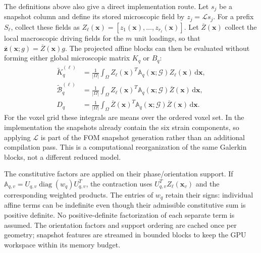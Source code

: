 \documentclass[pdflatex,sn-basic,Numbered]{sn-jnl}
\newcommand{\G}{\mathcal{G}}
\begin{document}
The definitions above also give a direct implementation route. Let
\(s_j\) be a snapshot column and define its stored microscopic field by
\(z_j=\mathcal Ls_j\). For a prefix \(S_\ell\), collect these fields as
\(Z_\ell(\boldsymbol x)=[z_1(\boldsymbol x),\ldots,z_{r_\ell}(\boldsymbol x)]\).
Let \(\overline Z(\boldsymbol x)\) collect the local macroscopic driving
fields for the \(m\) unit loadings, so that
\(\overline{\boldsymbol z}(\boldsymbol x;g)=\overline Z(\boldsymbol x)g\).
The projected affine blocks can then be evaluated without forming either
global microscopic matrix \(K_q\) or \(B_q\):
\begin{align}
\widetilde K_q^{(\ell)}
&=\frac{1}{|\Omega|}\int_\Omega
Z_\ell(\boldsymbol x)^T\mathbb A_q(\boldsymbol x;\G)
Z_\ell(\boldsymbol x)\,\mathrm d\boldsymbol x,\\
\widetilde{\mathcal B}_q^{(\ell)}
&=\frac{1}{|\Omega|}\int_\Omega
Z_\ell(\boldsymbol x)^T\mathbb A_q(\boldsymbol x;\G)
\overline Z(\boldsymbol x)\,\mathrm d\boldsymbol x,\\
D_q
&=\frac{1}{|\Omega|}\int_\Omega
\overline Z(\boldsymbol x)^T\mathbb A_q(\boldsymbol x;\G)
\overline Z(\boldsymbol x)\,\mathrm d\boldsymbol x.
\end{align}
For the voxel grid these integrals are means over the ordered voxel set. In
the implementation the snapshots already contain the six strain components,
so applying \(\mathcal L\) is part of the FOM snapshot generation rather than
an additional compilation pass. This is a computational reorganization of the
same Galerkin blocks, not a different reduced model.

The constitutive factors are applied on their phase/orientation support. If
\(\mathbb A_{q,v}=U_{q,v}\operatorname{diag}(w_q)U_{q,v}^T\), the contraction
uses \(U_{q,v}^TZ_\ell(\boldsymbol x_v)\) and the corresponding weighted
products. The entries of \(w_q\) retain their signs: individual affine terms can be
indefinite even though their admissible constitutive sum is positive definite.
No positive-definite factorization of each separate term is assumed.
The orientation factors and support ordering are cached once per
geometry; snapshot features are streamed in bounded blocks to keep the GPU
workspace within its memory budget.
\end{document}
